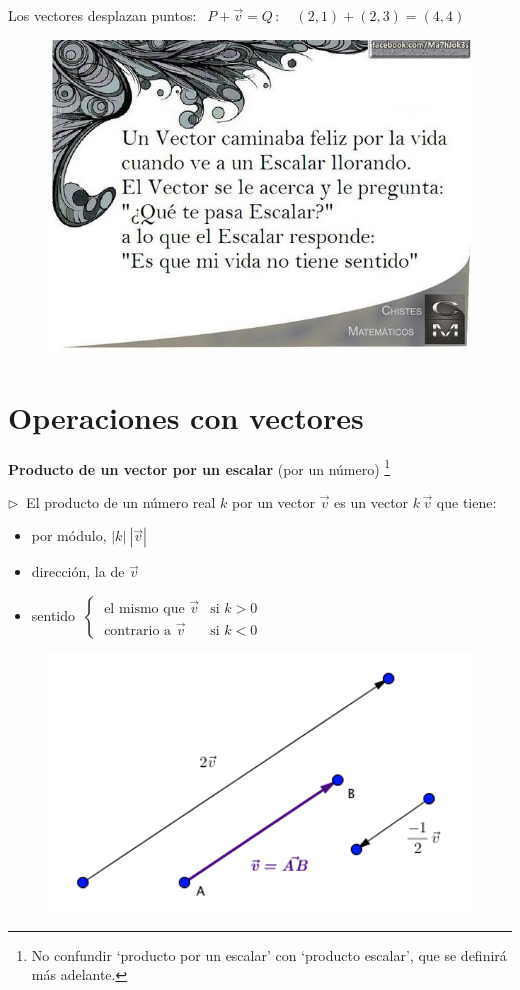 Los vectores desplazan puntos: $\ \ P+\vec v = Q\, : \quad (2,1)+(2,3)=(4,4)$	
\vspace{3mm}%
\begin{figure}[H]
	\centering
	\includegraphics[width=.5\textwidth]{img-vec/vec14.jpeg}	
\end{figure}
	
	
\section{Operaciones con vectores}
\vspace{0.5cm}		
	
\textbf{Producto de un vector por un escalar} (por un número) \footnote{ No confundir `producto por un escalar' con `producto escalar', que se definirá más adelante.}

$\triangleright \ $ El producto de un número real $k$ por un vector $\vec v$ es un vector $k\, \vec v$ que tiene:
\begin{multicols}{2}
\begin{itemize}
\item por módulo, $|k|\ |\vec v|$
\item dirección, la de $\vec v$
\item sentido $\ \begin{cases}	 \ \text{el mismo que } \vec v & \text{si } k>0 \\ \ \text{contrario a } \vec v & \text{si } k<0 \end{cases}$
\end{itemize}
\begin{figure}[H]
	\centering
	\includegraphics[width=.3\textwidth]{img-vec/vec05.png}	
\end{figure}
\end{multicols}

